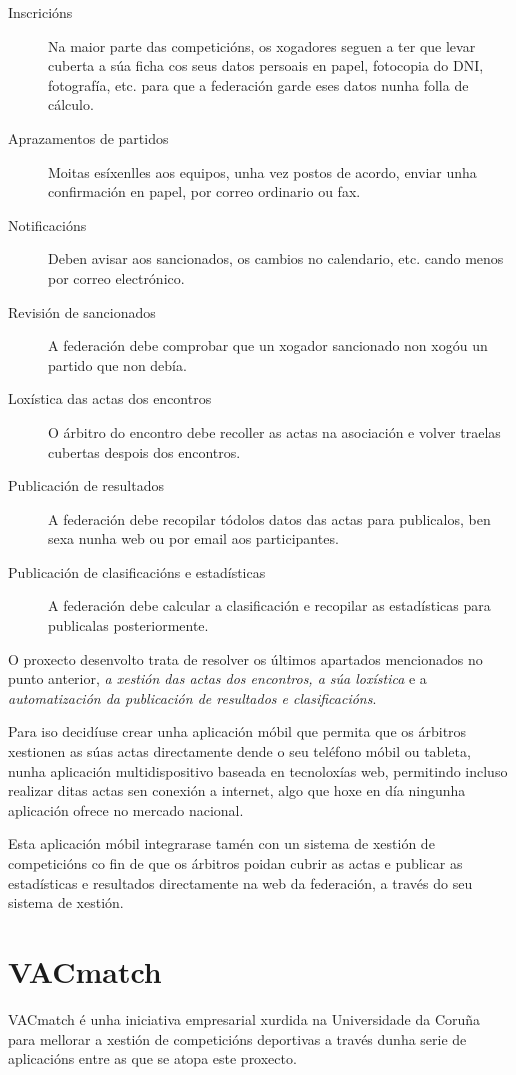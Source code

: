     \begin{description}
     \item [Inscricións] Na maior parte das competicións, os xogadores seguen a ter que 
levar cuberta a súa ficha cos seus datos persoais en papel, fotocopia do DNI, fotografía, 
etc. para que a federación garde eses datos nunha folla de cálculo.
     \item [Aprazamentos de partidos] Moitas esíxenlles aos equipos, unha vez 
postos de acordo, enviar unha confirmación en papel, por correo ordinario ou 
fax.
     \item [Notificacións] Deben avisar aos sancionados, os cambios no 
calendario, etc. cando menos por correo electrónico.
     \item [Revisión de sancionados] A federación debe comprobar que un xogador 
sancionado non xogóu un partido que non debía.
     \item [Loxística das actas dos encontros] O árbitro do encontro debe recoller as 
actas na asociación e volver traelas cubertas despois dos encontros.
     \item [Publicación de resultados] A federación debe recopilar tódolos datos das 
actas para publicalos, ben sexa nunha web ou por email aos participantes.
     \item [Publicación de clasificacións e estadísticas] A federación debe calcular a 
clasificación e recopilar as estadísticas para publicalas posteriormente.
    \end{description}

    O proxecto desenvolto trata de resolver os últimos apartados mencionados no 
punto anterior, \emph{a xestión das actas dos encontros, a súa loxística} e a 
\emph{automatización da publicación de resultados e clasificacións}.


  Para iso decidíuse crear unha aplicación móbil que permita que os árbitros 
xestionen as súas actas directamente dende o seu teléfono móbil ou tableta, 
nunha aplicación multidispositivo baseada en tecnoloxías web, permitindo incluso realizar 
ditas actas sen conexión a internet, algo que hoxe en día ningunha aplicación ofrece no 
mercado nacional.

  Esta aplicación móbil integrarase tamén con un sistema de xestión de 
competicións co fin de que os árbitros poidan cubrir as actas e publicar as 
estadísticas e resultados directamente na web da federación, a través do seu 
sistema de xestión.

    \section{VACmatch}
    VACmatch é unha iniciativa empresarial xurdida na Universidade da Coruña para 
mellorar a xestión de competicións deportivas a través dunha serie de 
aplicacións entre as que se atopa este proxecto.

